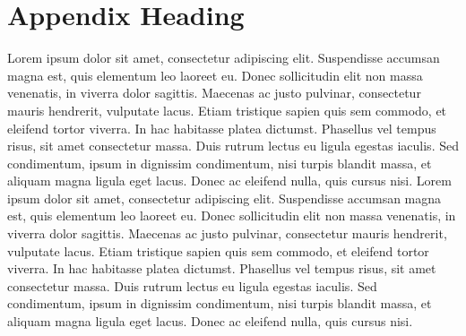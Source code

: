 \documentclass{winnower}
\begin{document}
\section{Appendix Heading}
Lorem ipsum dolor sit amet, consectetur adipiscing elit. Suspendisse accumsan magna est, quis elementum leo laoreet eu. Donec sollicitudin elit non massa venenatis, in viverra dolor sagittis. Maecenas ac justo pulvinar, consectetur mauris hendrerit, vulputate lacus. Etiam tristique sapien quis sem commodo, et eleifend tortor viverra. In hac habitasse platea dictumst. Phasellus vel tempus risus, sit amet consectetur massa. Duis rutrum lectus eu ligula egestas iaculis. Sed condimentum, ipsum in dignissim condimentum, nisi turpis blandit massa, et aliquam magna ligula eget lacus. Donec ac eleifend nulla, quis cursus nisi. Lorem ipsum dolor sit amet, consectetur adipiscing elit. Suspendisse accumsan magna est, quis elementum leo laoreet eu. Donec sollicitudin elit non massa venenatis, in viverra dolor sagittis. Maecenas ac justo pulvinar, consectetur mauris hendrerit, vulputate lacus. Etiam tristique sapien quis sem commodo, et eleifend tortor viverra. In hac habitasse platea dictumst. Phasellus vel tempus risus, sit amet consectetur massa. Duis rutrum lectus eu ligula egestas iaculis. Sed condimentum, ipsum in dignissim condimentum, nisi turpis blandit massa, et aliquam magna ligula eget lacus. Donec ac eleifend nulla, quis cursus nisi.
\end{document}
